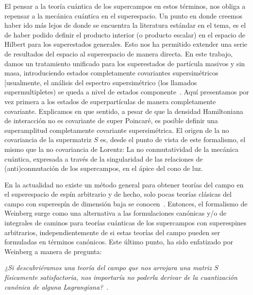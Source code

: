 El pensar a la teoría cuántica de los supercampos  en estos términos,  nos obliga a repensar a la mecánica cuántica en el superespacio. Un punto en donde creemos haber  ido más lejos de donde se encuentra  la literatura estándar en el tema, es el de haber podido definir el producto interior (o producto escalar) en el espacio de Hilbert para los superestados generales.
Esto nos ha permitido extender una serie de resultados del espacio al superespacio de manera directa. En este trabajo,  damos  un tratamiento unificado para los superestados de partícula masivos y sin masa, introduciendo estados completamente covariantes supersimétricos [usualmente, el análisis del espectro supersimétrico (los llamados supermultipletes) se queda a nivel de estados componente~\cite{julius1992supersymmetry,Weinberg:2000cr}. Aquí presentamos por vez primera a los  estados de superpartículas de manera completamente covariante. 
Explicamos en que sentido, a pesar de que la densidad  Hamiltoniana de interacción no es covariante de super Poincaré, es posible definir una superamplitud completamente covariante supersimétrica. El origen de la no covariancia de la supermatriz $ {S} $ es, desde el punto de vista de este formalismo, el mismo que la no covariancia de Lorentz: La no conmutatividad de la mecánica cuántica, expresada a través de la singularidad de las relaciones de (anti)conmutación de los supercampos, en el ápice del cono de luz. 


En la actualidad no existe un método general para obtener teorías del campo en el superespacio de espín arbitrario y de hecho, solo pocas teorías clásicas del campo  con superespín de dimensión baja se conocen~\cite{Buchbinder:2002gh,Buchbinder:2002tt,Gregoire:2004ic,Gates:2013tka}. Entonces, el formalismo de Weinberg surge como una alternativa a las formulaciones canónicas y/o de integrales de caminos para teorías cuánticas de los supercampos con superespines arbitrarios, independientemente de si estas teorías del campo  pueden ser formuladas en términos canónicos. Este último punto, ha sido enfatizado por Weinberg a  manera de pregunta:

\emph{¿Si descubriéramos una teoría del campo que nos arrojara una matriz $ {S} $ físicamente satisfactoria, nos importaría no poderla derivar de la cuantización canónica de alguna Lagrangiana?}~\cite{Weinberg:1995mt}.



